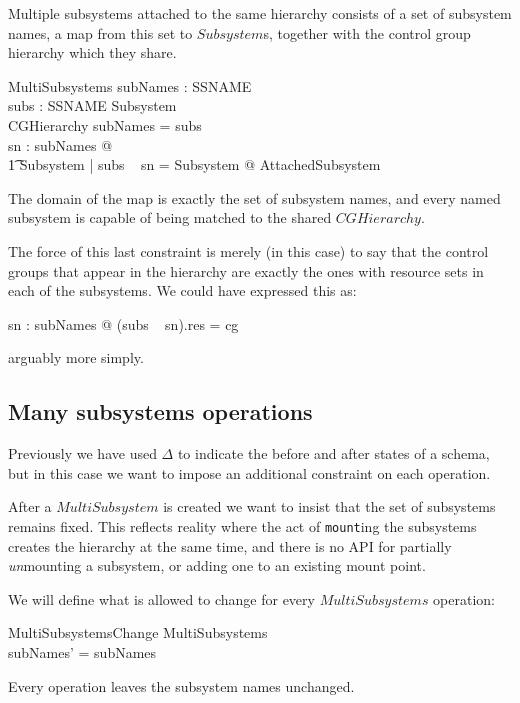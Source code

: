 \documentclass[a4paper,twoside,12pt]{article}
\begin{document}
Multiple subsystems attached to the same hierarchy consists of a set of subsystem names, a map from this set
to $Subsystem$s, together with the control group hierarchy which they share.
\begin{schema}{MultiSubsystems}
subNames : \finset SSNAME \\
subs : SSNAME \ffun Subsystem \\
CGHierarchy
\where
subNames = \dom subs \\
\forall sn : subNames @ \\
	\t1 \exists Subsystem | subs ~ sn = \theta Subsystem @ AttachedSubsystem 
\end{schema}
The domain of the map is exactly the set of subsystem names, and every named subsystem
is capable of being matched to the shared $CGHierarchy$.

The force of this last constraint is merely (in this case) to say that the control groups that appear in the
hierarchy are exactly the ones with resource sets in each of the subsystems. We could have expressed this as:

\begin{zed}
\forall sn : subNames @ \dom (subs ~ sn).res = \dom cg
\end{zed}
arguably more simply.

\subsection{Many subsystems operations}

Previously we have used $\Delta$ to indicate the before and after states of a schema, but in this case we want to
impose an additional constraint on each operation. 

After a $MultiSubsystem$ is created we want to insist that
the set of subsystems remains fixed. This reflects reality where the act of \texttt{mount}ing the subsystems creates the
hierarchy at the same time, and there is no API for partially \emph{un}mounting a subsystem, or adding one to an existing mount point.

We will define what is allowed to change for every $MultiSubsystems$ operation:

\begin{schema}{MultiSubsystemsChange}
\Delta MultiSubsystems \\
\where
subNames' = subNames \\
\end{schema}
Every operation leaves the subsystem names unchanged.
\end{document}
